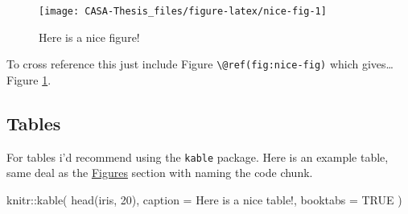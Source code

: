 \documentclass[
  12pt,
  oneside]{book}
\newenvironment{Shaded}{\begin{snugshade}}{\end{snugshade}}
\newcommand{\AttributeTok}[1]{\textcolor[rgb]{0.77,0.63,0.00}{#1}}
\newcommand{\ConstantTok}[1]{\textcolor[rgb]{0.00,0.00,0.00}{#1}}
\newcommand{\DecValTok}[1]{\textcolor[rgb]{0.00,0.00,0.81}{#1}}
\newcommand{\FunctionTok}[1]{\textcolor[rgb]{0.00,0.00,0.00}{#1}}
\newcommand{\NormalTok}[1]{#1}
\newcommand{\SpecialCharTok}[1]{\textcolor[rgb]{0.00,0.00,0.00}{#1}}
\newcommand{\StringTok}[1]{\textcolor[rgb]{0.31,0.60,0.02}{#1}}
\begin{document}
\begin{figure}
\texttt{[image: CASA-Thesis\_files/figure-latex/nice-fig-1]} \caption{Here is a nice figure!}\label{fig:nice-fig}
\end{figure}

To cross reference this just include Figure \texttt{\textbackslash{}@ref(fig:nice-fig)} which gives\ldots Figure \ref{fig:nice-fig}.

\hypertarget{tables}{%
\subsection{Tables}\label{tables}}

For tables i'd recommend using the \texttt{kable} package. Here is an example table, same deal as the \protect\hyperlink{figures}{Figures} section with naming the code chunk.

\begin{Shaded}
\begin{Highlighting}[]
\NormalTok{knitr}\SpecialCharTok{::}\FunctionTok{kable}\NormalTok{(}
  \FunctionTok{head}\NormalTok{(iris, }\DecValTok{20}\NormalTok{), }\AttributeTok{caption =} \StringTok{\textquotesingle{}Here is a nice table!\textquotesingle{}}\NormalTok{,}
  \AttributeTok{booktabs =} \ConstantTok{TRUE}
\NormalTok{)}
\end{Highlighting}
\end{Shaded}
\end{document}
